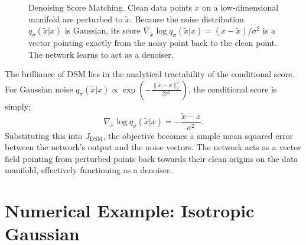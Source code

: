 \begin{figure}[htbp]
\centering
{}
\caption{Denoising Score Matching. Clean data points $x$ on a low-dimensional manifold are perturbed to $\tilde{x}$. Because the noise distribution $q_\sigma(\tilde{x}|x)$ is Gaussian, its score $\nabla_{\tilde{x}} \log q_\sigma(\tilde{x}|x) = (x - \tilde{x}) / \sigma^2$ is a vector pointing exactly from the noisy point back to the clean point. The network learns to act as a denoiser.}
\label{fig:denoising}
\end{figure}

The brilliance of DSM lies in the analytical tractability of the conditional score. For Gaussian noise $q_\sigma(\tilde{x}|x) \propto \exp(-\frac{\|\tilde{x} - x\|_2^2}{2\sigma^2})$, the conditional score is simply:
\begin{equation}
    \nabla_{\tilde{x}} \log q_\sigma(\tilde{x}|x) = -\frac{\tilde{x} - x}{\sigma^2}.
\end{equation}
Substituting this into $J_{\text{DSM}}$, the objective becomes a simple mean squared error between the network's output and the noise vectors. The network acts as a vector field pointing from perturbed points back towards their clean origins on the data manifold, effectively functioning as a denoiser.

\section{Numerical Example: Isotropic Gaussian}


